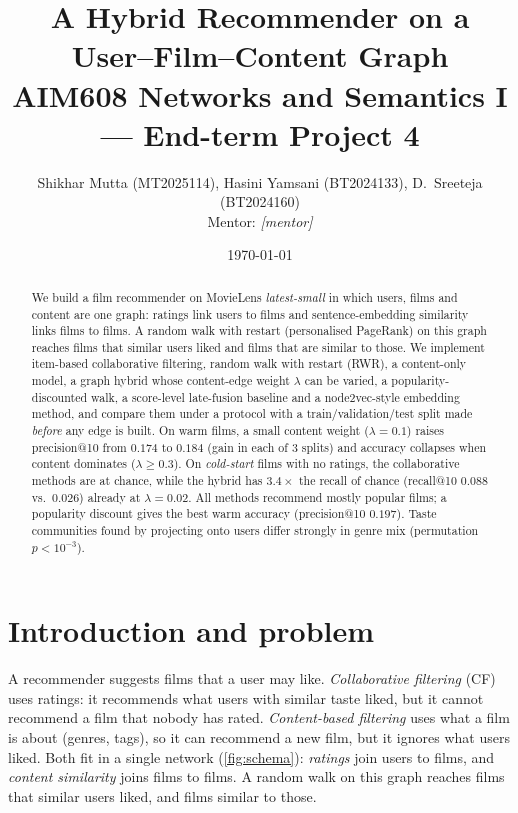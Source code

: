 \documentclass[11pt,a4paper]{article}
\title{\textbf{A Hybrid Recommender on a User--Film--Content Graph}\\[2pt]
\large AIM608 Networks and Semantics I --- End-term Project 4}
\author{Shikhar Mutta (MT2025114), Hasini Yamsani (BT2024133), D.\ Sreeteja (BT2024160)\\ Mentor: \emph{[mentor]}}
\date{\today}
\begin{document}
\maketitle

\begin{abstract}
\noindent We build a film recommender on MovieLens \emph{latest-small} in which users, films and content are one graph: ratings link users to films and sentence-embedding similarity links films to films. A random walk with restart (personalised PageRank) on this graph reaches films that similar users liked and films that are similar to those. We implement item-based collaborative filtering, random walk with restart (RWR), a content-only model, a graph hybrid whose content-edge weight $\lambda$ can be varied, a popularity-discounted walk, a score-level late-fusion baseline and a node2vec-style embedding method, and compare them under a protocol with a train/validation/test split made \emph{before} any edge is built. On warm films, a small content weight ($\lambda=0.1$) raises precision@10 from $0.174$ to $0.184$ (gain in each of 3 splits) and accuracy collapses when content dominates ($\lambda\ge0.3$). On \emph{cold-start} films with no ratings, the collaborative methods are at chance, while the hybrid has $3.4\times$ the recall of chance (recall@10 $0.088$ vs.\ $0.026$) already at $\lambda=0.02$. All methods recommend mostly popular films; a popularity discount gives the best warm accuracy (precision@10 $0.197$). Taste communities found by projecting onto users differ strongly in genre mix (permutation $p<10^{-3}$).
\end{abstract}

\tableofcontents


\section{Introduction and problem}
A recommender suggests films that a user may like. \emph{Collaborative filtering} (CF) uses ratings: it recommends what users with similar taste liked, but it cannot recommend a film that nobody has rated. \emph{Content-based filtering} uses what a film is about (genres, tags), so it can recommend a new film, but it ignores what users liked. Both fit in a single network (\cref{fig:schema}): \emph{ratings} join users to films, and \emph{content similarity} joins films to films. A random walk on this graph reaches films that similar users liked, and films similar to those.
\end{document}
